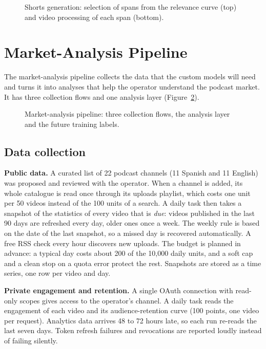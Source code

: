 \begin{figure}[H]
\centering
{}
\caption{Shorts generation: selection of spans from the relevance curve (top) and video processing of each span (bottom).}
\label{fig:shorts}
\end{figure}

\section{Market-Analysis Pipeline}
\label{s:market}

The market-analysis pipeline collects the data that the custom models will need and turns it into analyses that help the operator understand the podcast market. It has three collection flows and one analysis layer (Figure~\ref{fig:market}).

\begin{figure}[H]
\centering
{}
\caption{Market-analysis pipeline: three collection flows, the analysis layer and the future training labels.}
\label{fig:market}
\end{figure}

\subsection*{Data collection}

\textbf{Public data.} A curated list of 22 podcast channels (11 Spanish and 11 English) was proposed and reviewed with the operator. When a channel is added, its whole catalogue is read once through its uploads playlist, which costs one unit per 50 videos instead of the 100 units of a search. A daily task then takes a snapshot of the statistics of every video that is \textit{due}: videos published in the last 90 days are refreshed every day, older ones once a week. The weekly rule is based on the date of the last snapshot, so a missed day is recovered automatically. A free RSS check every hour discovers new uploads. The budget is planned in advance: a typical day costs about 200 of the 10{,}000 daily units, and a soft cap and a clean stop on a quota error protect the rest. Snapshots are stored as a time series, one row per video and day.

\textbf{Private engagement and retention.} A single OAuth connection with read-only scopes gives access to the operator's channel. A daily task reads the engagement of each video and its audience-retention curve (100 points, one video per request). Analytics data arrives 48 to 72 hours late, so each run re-reads the last seven days. Token refresh failures and revocations are reported loudly instead of failing silently.

